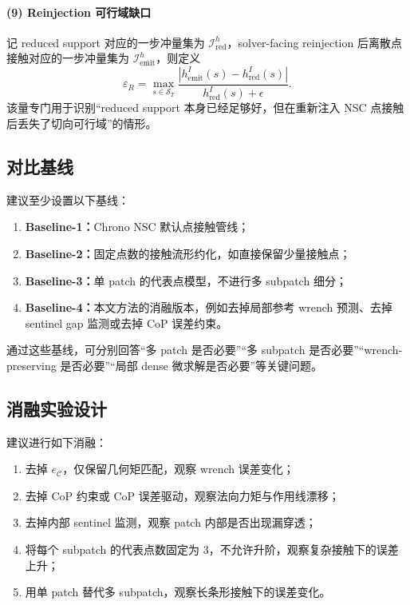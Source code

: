 \paragraph{(9) Reinjection 可行域缺口}
记 reduced support 对应的一步冲量集为 $\mathcal{I}_{\mathrm{red}}^{h}$，solver-facing reinjection 后离散点接触对应的一步冲量集为 $\mathcal{I}_{\mathrm{emit}}^{h}$，则定义
\begin{equation}
\varepsilon_R
=
\max_{s\in\mathcal{S}_{T}}
\frac{|h_{\mathrm{emit}}^{I}(s)-h_{\mathrm{red}}^{I}(s)|}
{h_{\mathrm{red}}^{I}(s)+\epsilon}.
\end{equation}
该量专门用于识别“reduced support 本身已经足够好，但在重新注入 NSC 点接触后丢失了切向可行域”的情形。

\subsection{对比基线}

建议至少设置以下基线：
\begin{enumerate}[label=(\arabic*)]
    \item \textbf{Baseline-1：}Chrono NSC 默认点接触管线；
    \item \textbf{Baseline-2：}固定点数的接触流形约化，如直接保留少量接触点；
    \item \textbf{Baseline-3：}单 patch 的代表点模型，不进行多 subpatch 细分；
    \item \textbf{Baseline-4：}本文方法的消融版本，例如去掉局部参考 wrench 预测、去掉 sentinel gap 监测或去掉 CoP 误差约束。
\end{enumerate}

通过这些基线，可分别回答“多 patch 是否必要”“多 subpatch 是否必要”“wrench-preserving 是否必要”“局部 dense 微求解是否必要”等关键问题。

\subsection{消融实验设计}

建议进行如下消融：
\begin{enumerate}[label=(\alph*)]
    \item 去掉 $e_{\mathcal{C}}$，仅保留几何矩匹配，观察 wrench 误差变化；
    \item 去掉 CoP 约束或 CoP 误差驱动，观察法向力矩与作用线漂移；
    \item 去掉内部 sentinel 监测，观察 patch 内部是否出现漏穿透；
    \item 将每个 subpatch 的代表点数固定为 3，不允许升阶，观察复杂接触下的误差上升；
    \item 用单 patch 替代多 subpatch，观察长条形接触下的误差变化。
\end{enumerate}


